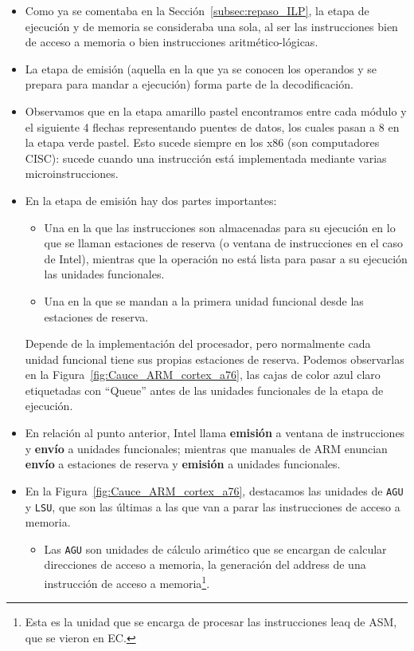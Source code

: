 \begin{itemize}
    \item Como ya se comentaba en la Sección~\ref{subsec:repaso_ILP}, la etapa de ejecución y de memoria se consideraba una sola, al ser las instrucciones bien de acceso a memoria o bien instrucciones aritmético-lógicas.
    \item La etapa de emisión (aquella en la que ya se conocen los operandos y se prepara para mandar a ejecución) forma parte de la decodificación.
    \item Observamos que en la etapa amarillo pastel encontramos entre cada módulo y el siguiente 4 flechas representando puentes de datos, los cuales pasan a 8 en la etapa verde pastel. Esto sucede siempre en los x86 (son computadores CISC): sucede cuando una instrucción está implementada mediante varias microinstrucciones.
    \item En la etapa de emisión hay dos partes importantes:
        \begin{itemize}
            \item Una en la que las instrucciones son almacenadas para su ejecución en lo que se llaman estaciones de reserva (o ventana de instrucciones en el caso de Intel), mientras que la operación no está lista para pasar a su ejecución las unidades funcionales.
            \item Una en la que se mandan a la primera unidad funcional desde las estaciones de reserva.
        \end{itemize}
        Depende de la implementación del procesador, pero normalmente cada unidad funcional tiene sus propias estaciones de reserva. Podemos observarlas en la Figura~\ref{fig:Cauce_ARM_cortex_a76}, las cajas de color azul claro etiquetadas con ``Queue'' antes de las unidades funcionales de la etapa de ejecución.
    \item En relación al punto anterior, Intel llama \textbf{emisión} a ventana de instrucciones y \textbf{envío} a unidades funcionales; mientras que manuales de ARM enuncian \textbf{envío} a estaciones de reserva y \textbf{emisión} a unidades funcionales.
    \item En la Figura~\ref{fig:Cauce_ARM_cortex_a76}, destacamos las unidades de \verb|AGU| y \verb|LSU|, que son las últimas a las que van a parar las instrucciones de acceso a memoria.
        \begin{itemize}
            \item Las \verb|AGU| son unidades de cálculo arimético que se encargan de calcular direcciones de acceso a memoria, la generación del address de una instrucción de acceso a memoria\footnote{Esta es la unidad que se encarga de procesar las instrucciones leaq de ASM, que se vieron en EC.}.

\end{itemize}
\end{itemize}
